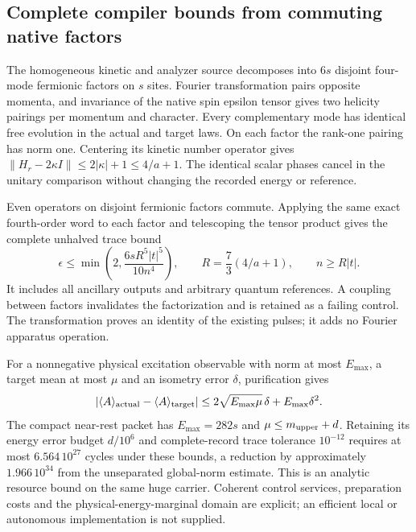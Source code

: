 \subsection{Complete compiler bounds from commuting native factors}

The homogeneous kinetic and analyzer source decomposes into $6s$ disjoint
four-mode fermionic factors on $s$ sites. Fourier transformation pairs
opposite momenta, and invariance of the native spin epsilon tensor gives
two helicity pairings per momentum and character. Every complementary
mode has identical free evolution in the actual and target laws. On each
factor the rank-one pairing has norm one. Centering its kinetic number
operator gives $\|H_r-2\kappa I\|\le 2|\kappa|+1\le4/a+1$.
The identical scalar phases cancel in the unitary comparison without
changing the recorded energy or reference.

Even operators on disjoint fermionic factors commute. Applying the same
exact fourth-order word to each factor and telescoping the tensor product
gives the complete unhalved trace bound
\[
 \epsilon\le\min\left(2,\frac{6sR^5|t|^5}{10n^4}\right),
 \qquad R=\frac73(4/a+1),\qquad n\ge R|t|.
\]
It includes all ancillary outputs and arbitrary quantum references.
A coupling between factors invalidates the factorization and is retained
as a failing control. The transformation proves an identity of the
existing pulses; it adds no Fourier apparatus operation.

For a nonnegative physical excitation observable with norm at most
$E_{\max}$, a target mean at most $\mu$ and an isometry error $\delta$,
purification gives
\[
 |\langle A\rangle_{\rm actual}-\langle A\rangle_{\rm target}|
 \le2\sqrt{E_{\max}\mu}\,\delta+E_{\max}\delta^2.
\]
The compact near-rest packet has $E_{\max}=282s$ and
$\mu\le m_{\rm upper}+d$. Retaining its energy error budget $d/10^6$
and complete-record trace tolerance $10^{-12}$ requires at most
$6.564\,10^{27}$ cycles under these bounds, a reduction by approximately
$1.966\,10^{34}$ from the unseparated global-norm estimate.
This is an analytic resource bound on the same huge carrier. Coherent
control services, preparation costs and the physical-energy-marginal
domain are explicit; an efficient local or autonomous implementation is
not supplied.
